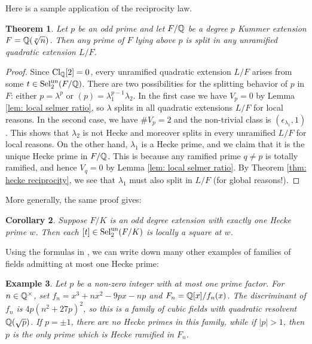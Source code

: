 \documentclass[11pt,a4paper]{amsart}
\def\Q{{\rm \mathbb{Q}}}
\def\un{{\rm un}}
\def\Cl{{\rm Cl}}
\def\Sel{{\rm Sel}}
\numberwithin{equation}{section}
\newtheorem{theorem}{Theorem}[section]
\newtheorem{example}[theorem]{Example}
\newtheorem{corollary}[theorem]{Corollary}
\begin{document}
Here is a sample application of the reciprocity law.

\begin{theorem}\label{thm: Kummer obstruction}
    Let $p$ be an odd prime and let $F/\Q$ be a degree $p$ Kummer extension $F = \Q(\sqrt[p]{n})$. Then any prime of $F$ lying above $p$ is split in any unramified quadratic extension $L/F$. 
\end{theorem}
\begin{proof}
Since $\Cl_\Q[2] = 0$, every unramified quadratic extension $L/F$ arises from some $t \in \Sel_2^\un(F/\Q)$.  There are two possibilities for the splitting behavior of $p$ in $F$: either $p = \lambda^p$ or $(p) = \lambda_1^{p-1} \lambda_2$. In the first case we have $V_p = 0$ by Lemma \ref{lem: local selmer ratio}, so $\lambda$ splits in all quadratic extensions $L/F$ for local reasons. In the second case, we have $\#V_p = 2$ and the non-trivial class is $(\epsilon_{\lambda_1},1)$. This shows that $\lambda_2$ is not Hecke and moreover splits in every unramified $L/F$ for local reasons. On the other hand, $\lambda_1$ is a Hecke prime, and we claim that it is the unique Hecke prime in $F/\Q$. This is because any ramified prime $q \neq p$ is totally ramified, and hence $V_q = 0$ by Lemma \ref{lem: local selmer ratio}.  By Theorem \ref{thm: hecke reciprocity}, we see that  $\lambda_1$ must also split in $L/F$ (for global reasons!).   
\end{proof}



More generally, the same proof gives:

\begin{corollary}
    Suppose $F/K$ is an odd degree extension with exactly one Hecke prime $w$. Then each $[t] \in \Sel_2^\un(F/K)$ is locally a square at $w$.  
\end{corollary}



Using the formulas in \cite{BhargavaShnidman14}, we can write down many other examples of families of fields admitting at most one Hecke prime: 


\begin{example}\label{ex: one Hecke ramified prime}
{\em 
    Let $p$ be a non-zero integer with at most one prime factor. For $n \in \Q^\times$, set $f_n = x^3 + nx^2 - 9px - np$ and  $F_n = \Q[x]/f_n(x)$. The discriminant of $f_n$ is $4p(n^2 + 27p)^2$, so this is a family of cubic fields with quadratic resolvent $\Q(\sqrt{p})$. If $p = \pm 1$, there are no Hecke primes in this family, while if $|p| > 1$, then $p$ is the only prime which is Hecke ramified in $F_n$. 
    }
\end{example}
\end{document}
